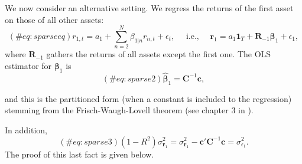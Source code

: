 We now consider an alternative setting. We regress the returns of the first asset on those of all other assets:
\begin{equation}
(\#eq:sparseeq)
r_{1,t}=a_1+\sum_{n=2}^N\beta_{1|n}r_{n,t}+\epsilon_t, \quad \text{ i.e., } \quad  \mathbf{r}_1=a_1\mathbf{1}_T+\mathbf{R}_{-1}\mathbf{\beta}_1+\epsilon_1,
\end{equation}
where $\mathbf{R}_{ -1}$ gathers the returns of all assets except the first one. The OLS estimator for $\mathbf{\beta}_1$ is
\begin{equation}
(\#eq:sparse2)
\hat{\mathbf{\beta}}_{1}=\mathbf{C}^{-1}\mathbf{c},
\end{equation}

and this is the partitioned form (when a constant is included to the regression) stemming from the Frisch-Waugh-Lovell theorem (see chapter 3 in \cite{greene2018econometric}).

In addition,
\begin{equation}
(\#eq:sparse3)
(1-R^2)\sigma_{\mathbf{r}_1}^2=\sigma_{\mathbf{r}_1}^2- \mathbf{c}'\mathbf{C}^{-1}\mathbf{c} =\sigma^2_{\epsilon_1}.
\end{equation}
The proof of this last fact is given below.

